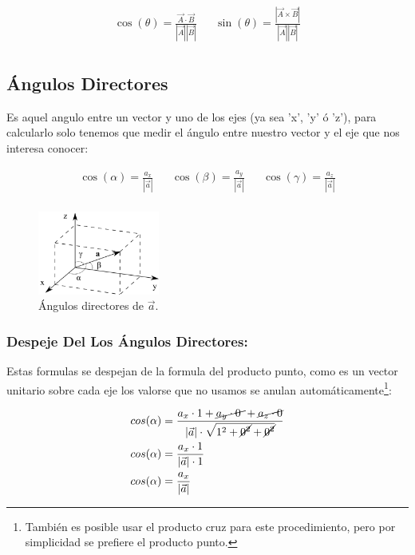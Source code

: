 \documentclass{article}
\begin{document}
\[ \begin{aligned}
\cos(\theta) = \frac{\vec{A} \cdot \vec{B}}{|\vec{A}||\vec{B}|} &&
\sin(\theta) = \frac{|\vec{A}\times\vec{B}|}{|\vec{A}||\vec{B}|} \\
\end{aligned} \]

\subsection{Ángulos Directores}
\label{sec:org3096b2d}
Es aquel angulo entre un vector y uno de los ejes (ya sea 'x', 'y' ó 'z'), para calcularlo solo tenemos que medir el ángulo entre nuestro vector y el eje que nos interesa conocer:

\[\begin{aligned}
  \cos(\alpha) = \frac{a_x}{|\vec{a}|} &&
  \cos(\beta)  = \frac{a_y}{|\vec{a}|} &&
  \cos(\gamma) = \frac{a_z}{|\vec{a}|} \\
\end{aligned} \]

\begin{figure}[htbp]
\centering
\includegraphics[width=4cm]{img/angulos-directores.png}
\caption{Ángulos directores de \(\vec{a}\).}
\end{figure}


\subsubsection*{Despeje Del Los Ángulos Directores:}
\label{sec:orgc60da01}
Estas formulas se despejan de la formula del producto punto, como es un vector unitario sobre cada eje los valorse que no usamos se anulan automáticamente\footnote{También es posible usar el producto cruz para este procedimiento, pero por simplicidad se prefiere el producto punto.}:

\[\begin{aligned}
  cos(\alpha) &= \frac{a_x \cdot 1 + \cancel{a_y \cdot 0~} + \cancel{a_z \cdot 0} }{|\vec{a}| \cdot \sqrt{1^2+\cancel{0^2}+\cancel{0^2}}} \\
  cos(\alpha) &= \frac{a_x \cdot 1}{|\vec{a}| \cdot 1} \\
  cos(\alpha) &= \frac{a_x}{|\vec{a}|} \\
\end{aligned} \]
\end{document}
